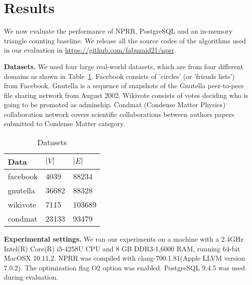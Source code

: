\section{Results}

We now evaluate the performance of NPRR, PostgreSQL and an in-memory triangle counting baseline. We release all the source codes of the algorithms used in our evaluation in \url{https://github.com/fabuzaid21/nprr}.


\textbf{Datasets.} We used four large real-world datasets, which are from four different domains as shown in Table~\ref{datasets}. Facebook consists of 'circles' (or 'friends lists') from Facebook. Gnutella is a sequence of snapshots of the Gnutella peer-to-peer file sharing network from August 2002. Wikivote consists of votes deciding who is going to  be promoted as adminship. Condmat (Condense Matter Physics) collaboration network covers scientific collaborations between authors papers submitted to Condense Matter category. 


\begin{table}[!h]
\centering

\begin{tabular}{|l|l|l|}
\hline
Data & $|V|$ & $|E|$ \\
\hline
facebook & 4039 & 88234  \\
\hline
gnutella & 36682 & 88328 \\
\hline
wikivote & 7115 & 103689 \\
\hline
condmat & 23133 & 93479 \\
\hline
\end{tabular}
\caption{Datasets}
\label{datasets}
\end{table}



\textbf{Experimental settings.} We ran our experiments on a machine with a 2.4GHz Intel(R) Core(R) i5-4258U CPU and 8 GB DDR3-1,6000 RAM, running 64-bit MacOSX 10.11.2. NPRR was compiled with clang-700.1.81(Apple LLVM version 7.0.2). The optimization flag O2 option was enabled. PostgreSQL 9.4.5 was used during evaluation. 

